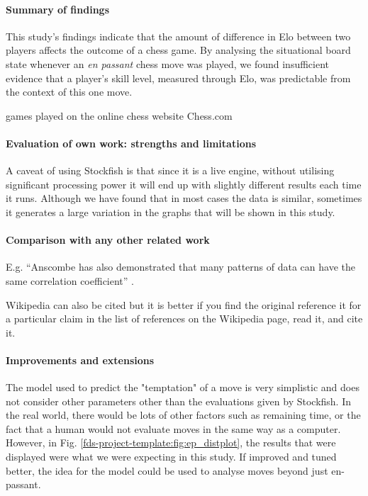 \documentclass[10pt,a4paper]{article}
\begin{document}
\begin{multicols}{2}
\paragraph{Summary of findings}
This study's findings indicate that the amount of difference in Elo between two players affects the outcome of a chess game. By analysing the situational board state whenever an \textit{en passant} chess move was played, we found insufficient evidence that a player's skill level, measured through Elo, was predictable from the context of this one move.


games played on the online chess website Chess.com

\paragraph{Evaluation of own work: strengths and limitations}
A caveat of using Stockfish is that since it is a live engine, without utilising significant processing power it will end up with slightly different results each time it runs. Although we have found that in most cases the data is similar, sometimes it generates a large variation in the graphs that will be shown in this study.



\paragraph{Comparison with any other related work}
E.g. ``Anscombe has also demonstrated that many patterns of data can
have the same correlation coefficient'' \cite{anscombe1973graphs}.

Wikipedia can also be cited but it is better if you find the original
reference it for a particular claim in the list of references on the
Wikipedia page, read it, and cite it.


\paragraph{Improvements and extensions}

The model used to predict the "temptation" of a move is very simplistic and does not consider other parameters other than the evaluations given by Stockfish. In the real world, there would be lots of other factors such as remaining time, or the fact that a human would not evaluate moves in the same way as a computer. However, in Fig. \ref{fds-project-template:fig:ep_distplot}, the results that were displayed were what we were expecting in this study. If improved and tuned better, the idea for the model could be used to analyse moves beyond just en-passant.

\end{multicols}

\printbibliography
\end{document}
